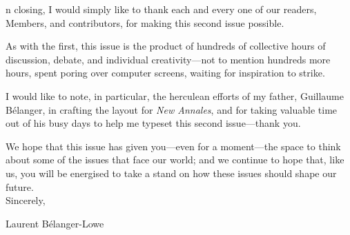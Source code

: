 \label{ch:letter-from-the-president}

n closing, I would simply like to thank each and every one of our readers, Members, and contributors, for making this second issue possible. 

As with the first, this issue is the product of hundreds of collective hours of discussion, debate, and individual creativity---not to mention hundreds more hours, spent poring over computer screens, waiting for inspiration to strike. 

I would like to note, in particular, the herculean efforts of my father, Guillaume B\'elanger, in crafting the layout for \textit{New Annales}, and for taking valuable time out of his busy days to help me typeset this second issue---thank you.

We hope that this issue has given you---even for a moment---the space to think about some of the issues that face our world; and we continue to hope that, like us, you will be energised to take a stand on how these issues should shape our future. \\

Sincerely,

Laurent B\'elanger-Lowe